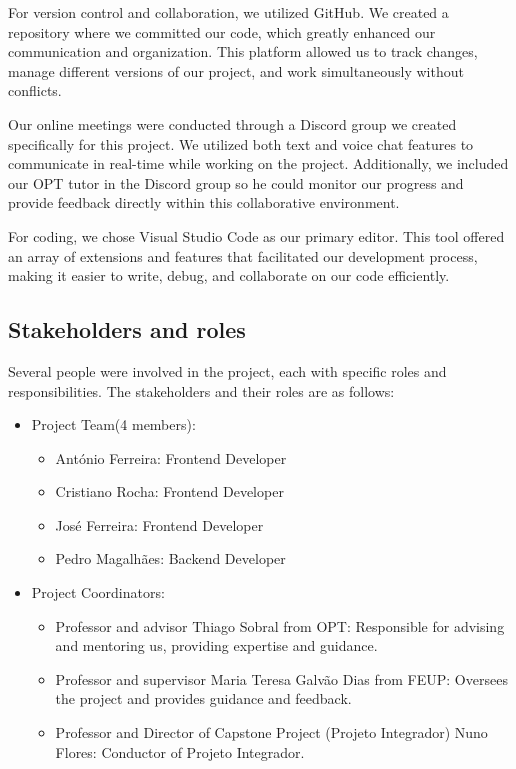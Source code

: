 \documentclass{article}
\begin{document}
For version control and collaboration, we utilized GitHub. We created a repository where we committed our code, which greatly enhanced our communication and organization. This platform allowed us to track changes, manage different versions of our project, and work simultaneously without conflicts.

Our online meetings were conducted through a Discord group we created specifically for this project. We utilized both text and voice chat features to communicate in real-time while working on the project. Additionally, we included our OPT tutor in the Discord group so he could monitor our progress and provide feedback directly within this collaborative environment.

For coding, we chose Visual Studio Code as our primary editor. This tool offered an array of extensions and features that facilitated our development process, making it easier to write, debug, and collaborate on our code efficiently.

\subsection{Stakeholders and roles}
Several people were involved in the project, each with specific roles and responsibilities. The stakeholders and their roles are as follows:
\begin{itemize}
    \item Project Team(4 members):
    \begin{itemize}
        \item António Ferreira: Frontend Developer
        \item Cristiano Rocha: Frontend Developer
        \item José Ferreira: Frontend Developer
        \item Pedro Magalhães: Backend Developer
    \end{itemize}
    \item Project Coordinators:
    \begin{itemize}
        \item Professor and advisor Thiago Sobral from OPT: Responsible for advising and mentoring us, providing expertise and guidance.
        \item Professor and supervisor Maria Teresa Galvão Dias from FEUP: Oversees the project and provides guidance and feedback.
        \item Professor and Director of Capstone Project (Projeto Integrador) Nuno Flores: Conductor of Projeto Integrador.
    \end{itemize}
\end{itemize}
\end{document}
